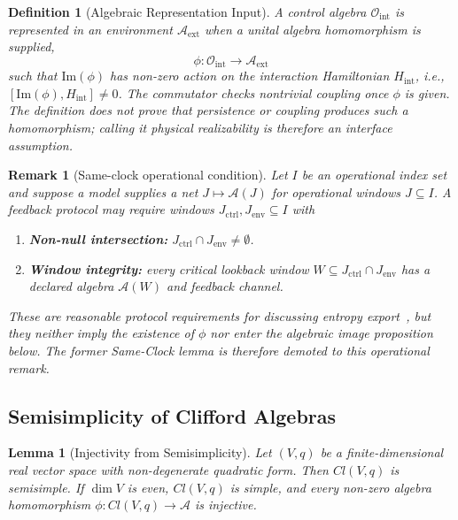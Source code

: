 \documentclass[12pt,a4paper,openany]{book}
\newtheorem{lemma}[theorem]{Lemma}
\newtheorem{definition}[theorem]{Definition}
\newtheorem{remark}[theorem]{Remark}
\begin{document}
\begin{definition}[Algebraic Representation Input]
\label{Q-C-def:realizability}
A control algebra $\mathcal{O}_{\mathrm{int}}$ is represented in an environment $\mathcal{A}_{\mathrm{ext}}$ when a unital algebra homomorphism is supplied,
\begin{equation}
    \phi: \mathcal{O}_{\mathrm{int}} \to \mathcal{A}_{\mathrm{ext}}
\end{equation}
such that $\mathrm{Im}(\phi)$ has non-zero action on the interaction Hamiltonian $H_{\mathrm{int}}$, i.e., $[\mathrm{Im}(\phi), H_{\mathrm{int}}] \neq 0$.
The commutator checks nontrivial coupling once $\phi$ is given.  The definition does not prove that persistence or coupling produces such a homomorphism; calling it physical realizability is therefore an interface assumption.
\end{definition}

\begin{remark}[Same-clock operational condition]
Let $I$ be an operational index set and suppose a model supplies a net $J\mapsto\mathcal A(J)$ for operational windows $J\subseteq I$.  A feedback protocol may require windows $J_{\mathrm{ctrl}},J_{\mathrm{env}}\subseteq I$ with
\begin{enumerate}
    \item \textbf{Non-null intersection:} $J_{\mathrm{ctrl}}\cap J_{\mathrm{env}}\neq\emptyset$.
    \item \textbf{Window integrity:} every critical lookback window $W\subseteq J_{\mathrm{ctrl}}\cap J_{\mathrm{env}}$ has a declared algebra $\mathcal A(W)$ and feedback channel.
\end{enumerate}
These are reasonable protocol requirements for discussing entropy export~\cite{Seifert2012}, but they neither imply the existence of $\phi$ nor enter the algebraic image proposition below.  The former Same-Clock lemma is therefore demoted to this operational remark.
\end{remark}

\subsection{Semisimplicity of Clifford Algebras}

\begin{lemma}[Injectivity from Semisimplicity]
\label{Q-C-lem:semisimple}
Let $(V,q)$ be a finite-dimensional real vector space with
non-degenerate quadratic form.
Then $Cl(V,q)$ is semisimple.
If\/ $\dim V$ is even, $Cl(V,q)$ is simple, and every
non-zero algebra homomorphism
$\phi: Cl(V,q) \to \mathcal{A}$ is injective.
\end{lemma}
\end{document}
